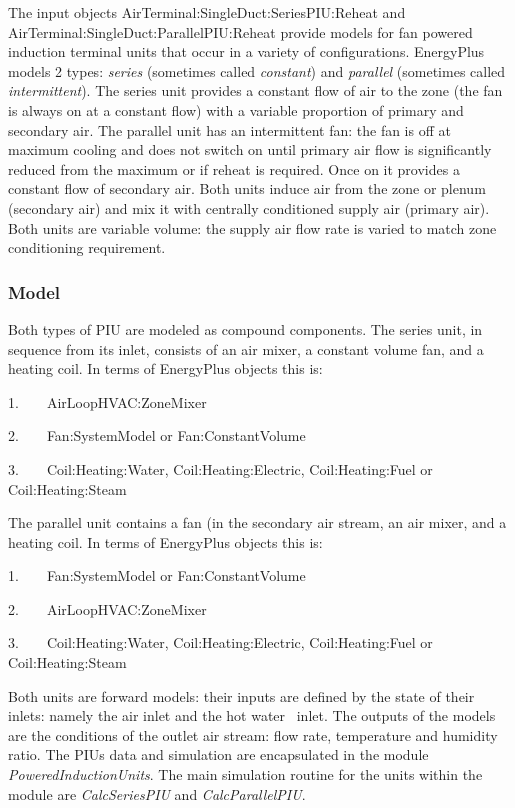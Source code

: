 The input objects AirTerminal:SingleDuct:SeriesPIU:Reheat and \\ AirTerminal:SingleDuct:ParallelPIU:Reheat provide models for fan powered induction terminal units that occur in a variety of configurations. EnergyPlus models 2 types: \emph{series} (sometimes called \emph{constant}) and \emph{parallel} (sometimes called \emph{intermittent}). The series unit provides a constant flow of air to the zone (the fan is always on at a constant flow) with a variable proportion of primary and secondary air. The parallel unit has an intermittent fan: the fan is off at maximum cooling and does not switch on until primary air flow is significantly reduced from the maximum or if reheat is required. Once on it provides a constant flow of secondary air. Both units induce air from the zone or plenum (secondary air) and mix it with centrally conditioned supply air (primary air). Both units are variable volume: the supply air flow rate is varied to match zone conditioning requirement.

\subsubsection{Model}\label{model-1}

Both types of PIU are modeled as compound components. The series unit, in sequence from its inlet, consists of an air mixer, a constant volume fan, and a heating coil. In terms of EnergyPlus objects this is:

1.~~~~AirLoopHVAC:ZoneMixer

2.~~~~Fan:SystemModel or Fan:ConstantVolume

3.~~~~Coil:Heating:Water, Coil:Heating:Electric, Coil:Heating:Fuel or Coil:Heating:Steam

The parallel unit contains a fan (in the secondary air stream, an air mixer, and a heating coil. In terms of EnergyPlus objects this is:

1.~~~~Fan:SystemModel or Fan:ConstantVolume

2.~~~~AirLoopHVAC:ZoneMixer

3.~~~~Coil:Heating:Water, Coil:Heating:Electric, Coil:Heating:Fuel or Coil:Heating:Steam

Both units are forward models: their inputs are defined by the state of their inlets: namely the air inlet and the hot water~ inlet. The outputs of the models are the conditions of the outlet air stream: flow rate, temperature and humidity ratio. The PIUs data and simulation are encapsulated in the module \emph{PoweredInductionUnits}. The main simulation routine for the units within the module are \emph{CalcSeriesPIU} and \emph{CalcParallelPIU}.


